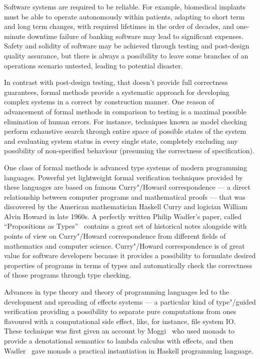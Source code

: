 \Intro

Software systems are required to be reliable. For example, biomedical implants must be able to operate autonomously within patients, adapting to short term and long term changes, with required lifetimes in the order of decades, and one-minute downtime failure of banking software may lead to significant expenses. Safety and solidity of software may be achieved through testing and post-design quality assurance, but there is always a possibility to leave some branches of an operations scenario untested, leading to potential disaster.

In contrast with post-design testing, that doesn’t provide full
correctness guarantees, formal methods provide a systematic approach for developing complex systems in a correct by construction manner. One reason of advancement of
formal methods in comparison to testing is a maximal possible elimination of human errors. For instance, techniques known as model checking perform exhaustive search
through entire space of possible states of the system and evaluating system status in
every single state, completely excluding any possibility of non-specified behaviour
(presuming the correctness of specification).

One class of formal methods is advanced type systems of modern programming languages. Powerful yet lightweight formal verification techniques provided by these languages are based on famous Curry"/Howard correspondence --- a direct relationship between computer programs and mathematical
proofs --- that was discovered by the American mathematician Haskell Curry and logician
William Alvin Howard in late 1960s. A perfectly written Philip Wadler’s paper,
called ``Propositions as Types''~\cite{Wadler:2015:PT:2847579.2699407}
contains a great set of historical notes alongside with points of view on
Curry"/Howard correspondence from different fields of
mathematics and computer science. Curry"/Howard correspondence is of great value
for software developers because it provides a possibility to formulate desired
properties of programs in terms of types and automatically check
the correctness of those programs through type checking.

Advances in type theory and theory of programming languages led to the development and spreading of effects systems --- a particular kind of type"/guided verification providing a possibility to separate pure computations from ones flavoured with a computational side effect, like, for instance, file system IO. These technique
was first given an account by Moggi~\cite{Moggi:1991:NCM:116981.116984} who
used monads to provide a denotational semantics to lambda calculus with effects, and then Wadler~\cite{Wadler:1992:EFP:143165.143169} gave monads a practical instantiation in Haskell programming language.


